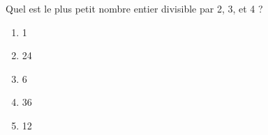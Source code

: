  Quel est le plus petit nombre entier divisible par 2, 3, et 4 ?
 \begin{multicols}{5}
   \begin{enumerate}[A/]
   \item 1
   \item 24
   \item 6
   \item 36
   \item 12
   \end{enumerate}
 \end{multicols}

